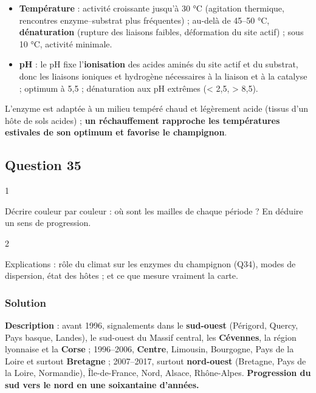 \documentclass[11pt,a4paper]{article}
\providecommand{\tightlist}{\setlength{\itemsep}{0pt}\setlength{\parskip}{0pt}}
\begin{document}
\begin{itemize}
\tightlist
\item
  \textbf{Température} : activité croissante jusqu'à 30 °C (agitation thermique, rencontres enzyme--substrat plus fréquentes) ; au-delà de 45--50 °C, \textbf{dénaturation} (rupture des liaisons faibles, déformation du site actif) ; sous 10 °C, activité minimale.
\item
  \textbf{pH} : le pH fixe l'\textbf{ionisation} des acides aminés du site actif et du substrat, donc les liaisons ioniques et hydrogène nécessaires à la liaison et à la catalyse ; optimum à 5,5 ; dénaturation aux pH extrêmes (\textless{} 2,5, \textgreater{} 8,5).
\end{itemize}

L'enzyme est adaptée à un milieu tempéré chaud et légèrement acide (tissus d'un hôte de sols acides) ; \textbf{un réchauffement rapproche les températures estivales de son optimum et favorise le champignon}.

\hypertarget{question-35}{%
\subsection{Question 35}\label{question-35}}

\begin{indication}{1}

Décrire couleur par couleur : où sont les mailles de chaque période ? En déduire un sens de progression.

\end{indication}

\begin{indication}{2}

Explications : rôle du climat sur les enzymes du champignon (Q34), modes de dispersion, état des hôtes ; et ce que mesure vraiment la carte.

\end{indication}

\hypertarget{solution-35}{%
\subsubsection{Solution}\label{solution-35}}

\textbf{Description} : avant 1996, signalements dans le \textbf{sud-ouest} (Périgord, Quercy, Pays basque, Landes), le sud-ouest du Massif central, les \textbf{Cévennes}, la région lyonnaise et la \textbf{Corse} ; 1996--2006, \textbf{Centre}, Limousin, Bourgogne, Pays de la Loire et surtout \textbf{Bretagne} ; 2007--2017, surtout \textbf{nord-ouest} (Bretagne, Pays de la Loire, Normandie), Île-de-France, Nord, Alsace, Rhône-Alpes. \textbf{Progression du sud vers le nord en une soixantaine d'années.}
\end{document}
